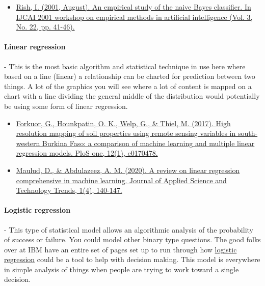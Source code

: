 \documentclass{article}
\begin{document}
\begin{itemize}
\item \href{https://www.researchgate.net/profile/Irina-Rish/publication/228845263_An_Empirical_Study_of_the_Naive_Bayes_Classifier/links/00b7d52dc3ccd8d692000000/An-Empirical-Study-of-the-Naive-Bayes-Classifier.pdf}{Rish, I. (2001, August). An empirical study of the naive Bayes classifier. In IJCAI 2001 workshop on empirical methods in artificial intelligence (Vol. 3, No. 22, pp. 41-46).} \cite{rish2001empirical}
\end{itemize}
\paragraph{Linear regression} - This is the most basic algorithm and statistical technique in use here where based on a line (linear) a relationship can be charted for prediction between two things. A lot of the graphics you will see where a lot of content is mapped on a chart with a line dividing the general middle of the distribution would potentially be using some form of linear regression. 

\begin{itemize}
\item \href{https://journals.plos.org/plosone/article/file?id=10.1371/journal.pone.0170478&type=printable}{Forkuor, G., Hounkpatin, O. K., Welp, G., \& Thiel, M. (2017). High resolution mapping of soil properties using remote sensing variables in south-western Burkina Faso: a comparison of machine learning and multiple linear regression models. PloS one, 12(1), e0170478.} \cite{forkuor2017high} 
\item \href{https://jastt.org/index.php/jasttpath/article/view/57/20}{Maulud, D., \& Abdulazeez, A. M. (2020). A review on linear regression comprehensive in machine learning. Journal of Applied Science and Technology Trends, 1(4), 140-147.} \cite{maulud2020review}
\end{itemize}
\paragraph{Logistic regression} - This type of statistical model allows an algorithmic analysis of the probability of success or failure. You could model other binary type questions. The good folks over at IBM have an entire set of pages set up to run through how \href{https://www.ibm.com/topics/logistic-regression }{logistic regression} could be a tool to help with decision making. This model is everywhere in simple analysis of things when people are trying to work toward a single decision. 
\end{document}
